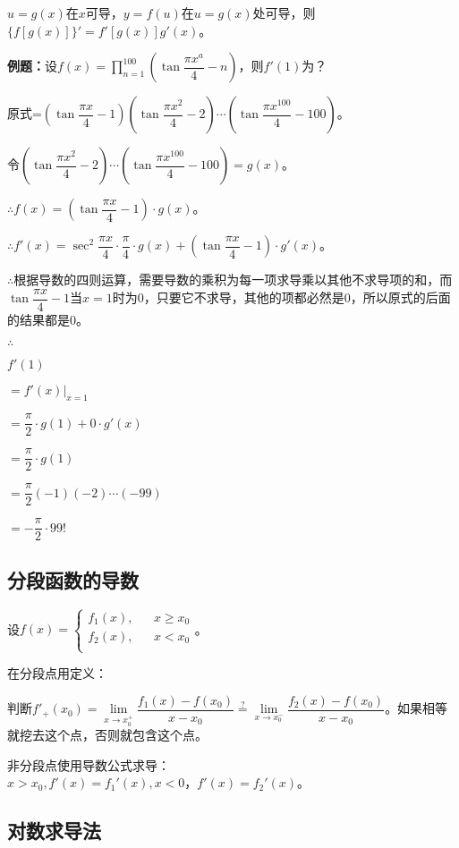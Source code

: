 \documentclass[UTF8, 12pt]{ctexart}
\begin{document}
$u=g(x)$在$x$可导，$y=f(u)$在$u=g(x)$处可导，则$\{f[g(x)]\}'=f'[g(x)]g'(x)$。

\textbf{例题：}设$f(x)=\prod\limits_{n=1}^{100}\left(\tan\dfrac{\pi x^a}{4}-n\right)$，则$f'(1)$为？

原式=$\left(\tan\dfrac{\pi x}{4}-1\right)\left(\tan\dfrac{\pi x^2}{4}-2\right)\cdots\left(\tan\dfrac{\pi x^100}{4}-100\right)$。

令$\left(\tan\dfrac{\pi x^2}{4}-2\right)\cdots\left(\tan\dfrac{\pi x^100}{4}-100\right)=g(x)$。\medskip

$\therefore f(x)=\left(\tan\dfrac{\pi x}{4}-1\right)\cdot g(x)$。\medskip

$\therefore f'(x)=\sec^2\dfrac{\pi x}{4}\cdot\dfrac{\pi}{4}\cdot g(x)+\left(\tan\dfrac{\pi x}{4}-1\right)\cdot g'(x)$。\medskip

$\therefore$根据导数的四则运算，需要导数的乘积为每一项求导乘以其他不求导项的和，而$\tan\dfrac{\pi x}{4}-1$当$x=1$时为0，只要它不求导，其他的项都必然是0，所以原式的后面的结果都是0。

$\therefore$

$f'(1)$

$=f'(x)\vert_{x=1}$\medskip

$=\dfrac{\pi}{2}\cdot g(1)+0\cdot g'(x)$\medskip

$=\dfrac{\pi}{2}\cdot g(1)$\medskip

$=\dfrac{\pi}{2}(-1)(-2)\cdots(-99)$

$=-\dfrac{\pi}{2}\cdot 99!$

\subsection{分段函数的导数}

设$f(x)=\left\{
    \begin{array}{lcl}
        f_1(x), & & x\geqslant x_0 \\
        f_2(x), & & x<x_0 \\
    \end{array}
\right.$。\medskip

在分段点用定义：

判断$f'_+(x_0)=\lim\limits_{x\to x_0^+}\dfrac{f_1(x)-f(x_0)}{x-x_0}\overset{?}{=}\lim\limits_{x\to x_0^-}\dfrac{f_2(x)-f(x_0)}{x-x_0}$。如果相等就挖去这个点，否则就包含这个点。

非分段点使用导数公式求导：$x>x_0,f'(x)=f_1'(x),x<0，f'(x)=f_2'(x)$。

\subsection{对数求导法}
\end{document}
